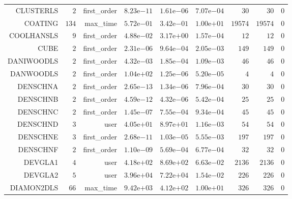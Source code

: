 \begin{longtable}{rrrrrrrrr}
CLUSTERLS & \(     2\) & first\_order & \( 8.23\)e\(-11\) & \( 1.61\)e\(-06\) & \( 7.07\)e\(-04\) & \(    30\) & \(    30\) & \(     0\) \\
COATING & \(   134\) & max\_time & \( 5.72\)e\(-01\) & \( 3.42\)e\(-01\) & \( 1.00\)e\(+01\) & \( 19574\) & \( 19574\) & \(     0\) \\
COOLHANSLS & \(     9\) & first\_order & \( 4.88\)e\(-02\) & \( 3.17\)e\(+00\) & \( 1.57\)e\(-04\) & \(    12\) & \(    12\) & \(     0\) \\
CUBE & \(     2\) & first\_order & \( 2.31\)e\(-06\) & \( 9.64\)e\(-04\) & \( 2.05\)e\(-03\) & \(   149\) & \(   149\) & \(     0\) \\
DANIWOODLS & \(     2\) & first\_order & \( 4.32\)e\(-03\) & \( 1.85\)e\(-04\) & \( 1.09\)e\(-03\) & \(    46\) & \(    46\) & \(     0\) \\
DANWOODLS & \(     2\) & first\_order & \( 1.04\)e\(+02\) & \( 1.25\)e\(-06\) & \( 5.20\)e\(-05\) & \(     4\) & \(     4\) & \(     0\) \\
DENSCHNA & \(     2\) & first\_order & \( 2.65\)e\(-13\) & \( 1.34\)e\(-06\) & \( 7.96\)e\(-04\) & \(    30\) & \(    30\) & \(     0\) \\
DENSCHNB & \(     2\) & first\_order & \( 4.59\)e\(-12\) & \( 4.32\)e\(-06\) & \( 5.42\)e\(-04\) & \(    25\) & \(    25\) & \(     0\) \\
DENSCHNC & \(     2\) & first\_order & \( 1.45\)e\(-07\) & \( 7.55\)e\(-04\) & \( 9.34\)e\(-04\) & \(    45\) & \(    45\) & \(     0\) \\
DENSCHND & \(     3\) & user & \( 4.05\)e\(+01\) & \( 8.97\)e\(+01\) & \( 1.16\)e\(-03\) & \(    54\) & \(    54\) & \(     0\) \\
DENSCHNE & \(     3\) & first\_order & \( 2.68\)e\(-11\) & \( 1.03\)e\(-05\) & \( 5.55\)e\(-03\) & \(   197\) & \(   197\) & \(     0\) \\
DENSCHNF & \(     2\) & first\_order & \( 1.10\)e\(-09\) & \( 5.69\)e\(-04\) & \( 6.77\)e\(-04\) & \(    32\) & \(    32\) & \(     0\) \\
DEVGLA1 & \(     4\) & user & \( 4.18\)e\(+02\) & \( 8.69\)e\(+02\) & \( 6.63\)e\(-02\) & \(  2136\) & \(  2136\) & \(     0\) \\
DEVGLA2 & \(     5\) & user & \( 3.96\)e\(+04\) & \( 7.22\)e\(+04\) & \( 1.54\)e\(-02\) & \(   226\) & \(   226\) & \(     0\) \\
DIAMON2DLS & \(    66\) & max\_time & \( 9.42\)e\(+03\) & \( 4.12\)e\(+02\) & \( 1.00\)e\(+01\) & \(   326\) & \(   326\) & \(     0\) \\

\end{longtable}
